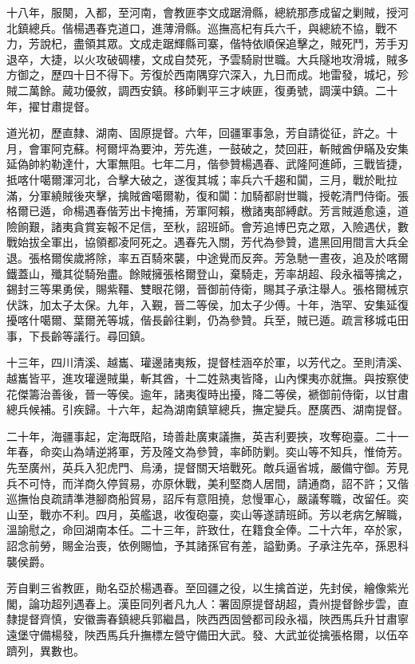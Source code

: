 \begin{pinyinscope}
十八年，服闋，入都，至河南，會教匪李文成踞滑縣，總統那彥成留之剿賊，授河北鎮總兵。偕楊遇春克道口，進薄滑縣。巡撫高杞有兵六千，與總統不協，戰不力，芳說杞，盡領其眾。文成走踞輝縣司寨，偕特依順保追擊之，賊死鬥，芳手刃退卒，大捷，以火攻破碉樓，文成自焚死，予雲騎尉世職。大兵隧地攻滑城，賊多方御之，歷四十日不得下。芳復於西南隅穿穴深入，九日而成。地雷發，城圮，殄賊二萬餘。蕆功優敘，調西安鎮。移師剿平三才峽匪，復勇號，調漢中鎮。二十年，擢甘肅提督。

道光初，歷直隸、湖南、固原提督。六年，回疆軍事急，芳自請從征，許之。十月，會軍阿克蘇。柯爾坪為要沖，芳先進，一鼓破之，焚回莊，斬賊酋伊瞞及安集延偽帥約勒達什，大軍無阻。七年二月，偕參贊楊遇春、武隆阿進師，三戰皆捷，抵喀什噶爾渾河北，合擊大破之，遂復其城；率兵六千趨和闐，三月，戰於毗拉滿，分軍繞賊後夾擊，擒賊酋噶爾勒，復和闐：加騎都尉世職，授乾清門侍衛。張格爾已遁，命楊遇春偕芳出卡掩捕，芳軍阿賴，檄諸夷部縛獻。芳言賊遁愈遠，道險餉艱，諸夷貪賞妄報不足信，至秋，詔班師。會芳追博巴克之眾，入險遇伏，數戰始拔全軍出，協領都凌阿死之。遇春先入關，芳代為參贊，遣黑回用間言大兵全退。張格爾俟歲將除，率五百騎來襲，中途覺而反奔。芳急馳一晝夜，追及於喀爾鐵蓋山，殲其從騎殆盡。餘賊擁張格爾登山，棄騎走，芳率胡超、段永福等擒之，錫封三等果勇侯，賜紫韁、雙眼花翎，晉御前侍衛，賜其子承注舉人。張格爾械京伏誅，加太子太保。九年，入覲，晉二等侯，加太子少傅。十年，浩罕、安集延復擾喀什噶爾、葉爾羌等城，偕長齡往剿，仍為參贊。兵至，賊已遁。疏言移城屯田事，下長齡等議行。尋回鎮。

十三年，四川清溪、越巂、瓘邊諸夷叛，提督桂涵卒於軍，以芳代之。至則清溪、越巂皆平，進攻瓘邊賊巢，斬其酋，十二姓熟夷皆降，山內惈夷亦就撫。與按察使花傑籌治善後，晉一等侯。逾年，諸夷復時出擾，降二等侯，褫御前侍衛，以甘肅總兵候補。引疾歸。十六年，起為湖南鎮筸總兵，撫定變兵。歷廣西、湖南提督。

二十年，海疆事起，定海既陷，琦善赴廣東議撫，英吉利要挾，攻奪砲臺。二十一年春，命奕山為靖逆將軍，芳及隆文為參贊，率師防剿。奕山等不知兵，惟倚芳。先至廣州，英兵入犯虎門、烏湧，提督關天培戰死。敵兵逼省城，嚴備守御。芳見兵不可恃，而洋商久停貿易，亦原休戰，美利堅商人居間，請通商，詔不許；又偕巡撫怡良疏請準港腳商船貿易，詔斥有意阻撓，怠慢軍心，嚴議奪職，改留任。奕山至，戰亦不利。四月，英艦退，收復砲臺，奕山等遂請班師。芳以老病乞解職，溫諭慰之，命回湖南本任。二十三年，許致仕，在籍食全俸。二十六年，卒於家，詔念前勞，賜金治喪，依例賜恤，予其諸孫官有差，謚勤勇。子承注先卒，孫恩科襲侯爵。

芳自剿三省教匪，勛名亞於楊遇春。至回疆之役，以生擒首逆，先封侯，繪像紫光閣，論功超列遇春上。漢臣同列者凡九人：署固原提督胡超，貴州提督餘步雲，直隸提督齊慎，安徽壽春鎮總兵郭繼昌，陜西西固營都司段永福，陜西馬兵升甘肅寧遠堡守備楊發，陜西馬兵升撫標左營守備田大武。發、大武並從擒張格爾，以伍卒躋列，異數也。


\end{pinyinscope}
